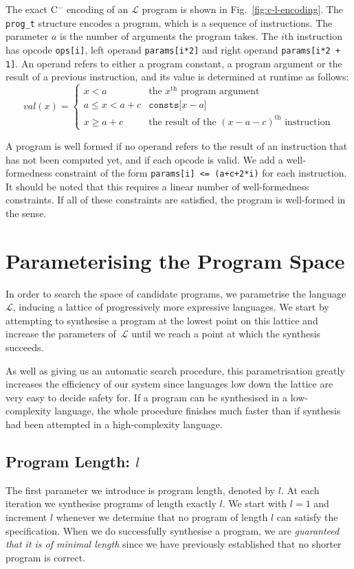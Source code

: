 \documentclass[a4paper]{llncs}
\newcommand{\newC}{C$^-$\xspace}
\begin{document}
The exact \newC encoding of an $\mathcal{L}$ program is shown in Fig.~\ref{fig:c-l-encoding}.
The \verb|prog_t| structure encodes a program, which is a sequence of instructions.
The parameter $a$ is the number of arguments the program takes.
The $i$th instruction has opcode \verb|ops[i]|, left operand \verb|params[i*2]| and
right operand \verb|params[i*2 + 1]|.  An operand refers to either a program constant,
a program argument or the result of a previous instruction, and its value
is determined at runtime as follows:
\[
 val(x) = \begin{cases}
           x < a & \text{the } x^{\text{th}} \text{ program argument} \\
           a \leq x < a+c & \mathtt{consts[} x-a \mathtt{]} \\
           x \geq a + c & \text{the result of the } (x - a - c)^{\text{th}} \text{ instruction}
          \end{cases}
\]


A program is well formed if
no operand refers to the result of an instruction that has not been computed yet, and if
each opcode is valid.  We add a well-formedness constraint of the form \verb|params[i] <= (a+c+2*i)|
for each instruction.  It should be noted that this requires a linear number of well-formedness
constraints.  If all of these constraints are satisfied, the program is well-formed in the sense.



\section{Parameterising the Program Space}

In order to search the space of candidate programs, we parametrise
the language~$\mathcal{L}$, inducing a lattice of progressively
more expressive languages.  We start by attempting to synthesise
a program at the lowest point on this lattice and increase the
parameters of~$\mathcal{L}$ until we reach a point at which
the synthesis succeeds.

As well as giving us an automatic search procedure, this parametrisation
greatly increases the efficiency of our system since languages
low down the lattice are very easy to decide safety for.  If a program
can be synthesised in a low-complexity language, the whole procedure
finishes much faster than if synthesis had been attempted in a
high-complexity language.

\subsection{Program Length: $l$}
The first parameter we introduce is program length, denoted by $l$.
At each iteration we synthesise programs of length exactly $l$.
We start with $l = 1$ and increment $l$ whenever we determine
that no program of length $l$ can satisfy the specification.  When we do
successfully synthesise a program, we are \emph{guaranteed that it
is of minimal length} since we have previously established that no
shorter program is correct.
\end{document}
